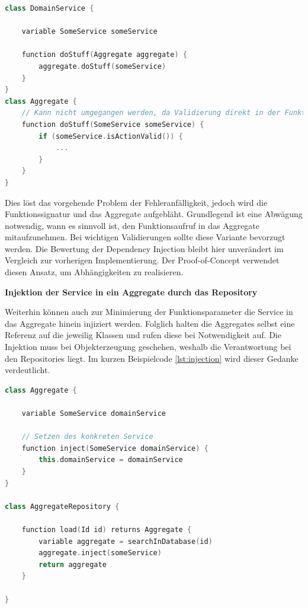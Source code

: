 \begin{minipage}{\linewidth} %
	\begin{lstlisting}[caption={Übergabe der Referenz an das Aggregate als Parameter}, label={lst:parameter}, language=Kotlin]
class DomainService {
	
	variable SomeService someService
	
	function doStuff(Aggregate aggregate) {
		aggregate.doStuff(someService)
	}
}
class Aggregate {
	// Kann nicht umgegangen werden, da Validierung direkt in der Funktion geschieht
	function doStuff(SomeService someService) {
		if (someService.isActionValid()) {
			...
		}
	}
}
	\end{lstlisting}
\end{minipage}

Dies löst das vorgehende Problem der Fehleranfälligkeit, jedoch wird die Funktionssignatur und das Aggregate aufgebläht. Grundlegend ist eine Abwägung notwendig, wann es sinnvoll ist, den Funktionsaufruf in das Aggregate mitaufzunehmen. Bei wichtigen Validierungen sollte diese Variante bevorzugt werden. Die Bewertung der Dependency Injection bleibt hier unverändert im Vergleich zur vorherigen Implementierung. Der Proof-of-Concept verwendet diesen Ansatz, um Abhängigkeiten zu realisieren.

\textbf{Injektion der Service in ein Aggregate durch das Repository}

Weiterhin können auch zur Minimierung der Funktionsparameter die Service in das Aggregate hinein injiziert werden. Folglich halten die Aggregates selbst eine Referenz auf die jeweilig Klassen und rufen diese bei Notwendigkeit auf. Die Injektion muss bei Objekterzeugung geschehen, weshalb die Verantwortung bei den Repositories liegt. Im kurzen Beispielcode \ref{lst:injection} wird dieser Gedanke verdeutlicht.

\begin{minipage}{\linewidth} %
	\begin{lstlisting}[caption={Injektion des Services in ein Aggregate durch das Repository}, label={lst:injection}, language=Kotlin]
class Aggregate {
	
	variable SomeService domainService
	
	// Setzen des konkreten Service
	function inject(SomeService domainService) {
		this.domainService = domainService
	}
}

class AggregateRepository {
	
	function load(Id id) returns Aggregate {
		variable aggregate = searchInDatabase(id)
		aggregate.inject(someService)
		return aggregate
	}
	
}
	\end{lstlisting}
\end{minipage}

